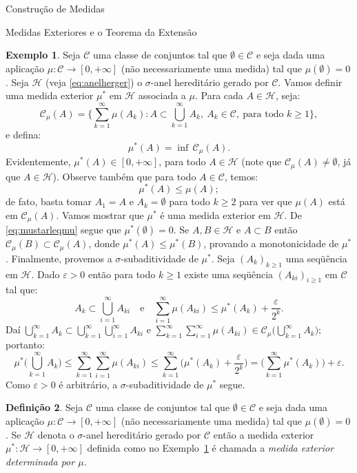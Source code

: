 \documentclass[oneside,final,11pt]{amsbook}
\theoremstyle{remark}\newtheorem{exercise}{Exercício}[chapter]
\theoremstyle{remark}\newtheorem{*exercise}[exercise]{\hbox to 0pt{\hskip 0pt minus 1fil*}Exercício}
\theoremstyle{definition}\newtheorem{exdefin}{Definição}[chapter]
\theoremstyle{plain}\newtheorem{teo}{Teorema}[section]
\theoremstyle{plain}\newtheorem{lem}[teo]{Lema}
\theoremstyle{plain}\newtheorem{prop}[teo]{Proposição}
\theoremstyle{plain}\newtheorem{cor}[teo]{Corolário}
\theoremstyle{definition}\newtheorem{defin}[teo]{Definição}
\theoremstyle{remark}\newtheorem{rem}[teo]{Observação}
\theoremstyle{definition}\newtheorem{notation}[teo]{Notação}
\theoremstyle{definition}\newtheorem{convention}[teo]{Convenção}
\theoremstyle{definition}\newtheorem{example}[teo]{Exemplo}
\numberwithin{section}{chapter}
\numberwithin{equation}{section}
\begin{document}
\begin{chapter}{Construção de Medidas}
\begin{section}{Medidas Exteriores e o Teorema da Extensão}
\begin{example}\label{exa:mustarassocmu}
Seja $\mathcal C$ uma classe de conjuntos tal que $\emptyset\in\mathcal C$ e seja
dada uma aplicação $\mu:\mathcal C\to[0,+\infty]$ (não necessariamente uma medida)
tal que $\mu(\emptyset)=0$. Seja $\mathcal H$ (veja \eqref{eq:anelherger}) o
$\sigma$-anel hereditário gerado por $\mathcal C$. Vamos
definir uma medida exterior $\mu^*$ em $\mathcal H$ associada a $\mu$. Para
cada $A\in\mathcal H$, seja:
\[\mathcal C_\mu(A)=\Big\{\sum_{k=1}^\infty\mu(A_k):A\subset\bigcup_{k=1}^\infty A_k,\ A_k\in\mathcal C,\
\text{para todo $k\ge1$}\Big\},\]
e defina:
\[\mu^*(A)=\inf\,\mathcal C_\mu(A).\]
Evidentemente, $\mu^*(A)\in[0,+\infty]$, para todo $A\in\mathcal H$ (note que
$\mathcal C_\mu(A)\ne\emptyset$, já que $A\in\mathcal H$). Observe também que para todo $A\in\mathcal C$, temos:
\begin{equation}\label{eq:mustarleqmu}
\mu^*(A)\le\mu(A);
\end{equation}
de fato, basta tomar $A_1=A$ e $A_k=\emptyset$ para todo $k\ge2$ para ver que $\mu(A)$ está em $\mathcal C_\mu(A)$.
Vamos mostrar que $\mu^*$ é uma medida
exterior em $\mathcal H$. De \eqref{eq:mustarleqmu} segue que $\mu^*(\emptyset)=0$.
Se $A,B\in\mathcal H$ e $A\subset B$ então $\mathcal C_\mu(B)\subset\mathcal C_\mu(A)$, donde $\mu^*(A)\le\mu^*(B)$,
provando a monotonicidade de $\mu^*$. Finalmente, provemos a $\sigma$-subaditividade
de $\mu^*$. Seja $(A_k)_{k\ge1}$ uma seqüência em $\mathcal H$. Dado $\varepsilon>0$
então para todo $k\ge1$ existe uma seqüência $(A_{ki})_{i\ge1}$ em $\mathcal C$
tal que:
\[A_k\subset\bigcup_{i=1}^\infty A_{ki}\quad\text{e}\quad
\sum_{i=1}^\infty\mu(A_{ki})\le\mu^*(A_k)+\frac\varepsilon{2^k}.\]
Daí $\bigcup_{k=1}^\infty A_k\subset\bigcup_{k=1}^\infty\bigcup_{i=1}^\infty A_{ki}$
e $\sum_{k=1}^\infty\sum_{i=1}^\infty\mu(A_{ki})\in\mathcal C_\mu\big(\bigcup_{k=1}^\infty A_k\big)$; portanto:
\[\mu^*\Big(\bigcup_{k=1}^\infty A_k\Big)\le\sum_{k=1}^\infty\sum_{i=1}^\infty\mu(A_{ki})
\le\sum_{k=1}^\infty\Big(\mu^*(A_k)+\frac\varepsilon{2^k}\Big)=\Big(\sum_{k=1}^\infty\mu^*(A_k)\Big)
+\varepsilon.\]
Como $\varepsilon>0$ é arbitrário, a $\sigma$-subaditividade de $\mu^*$ segue.
\end{example}

\begin{defin}
Seja $\mathcal C$ uma classe de conjuntos tal que $\emptyset\in\mathcal C$ e seja
dada uma aplicação $\mu:\mathcal C\to[0,+\infty]$ (não necessariamente uma medida)
tal que $\mu(\emptyset)=0$. Se $\mathcal H$ denota o $\sigma$-anel hereditário gerado por
$\mathcal C$ então a medida exterior $\mu^*:\mathcal H\to[0,+\infty]$ definida como
no Exemplo~\ref{exa:mustarassocmu} é chamada a
{\em medida exterior determinada por $\mu$}.
\end{defin}


\end{section}
\end{chapter}
\end{document}
